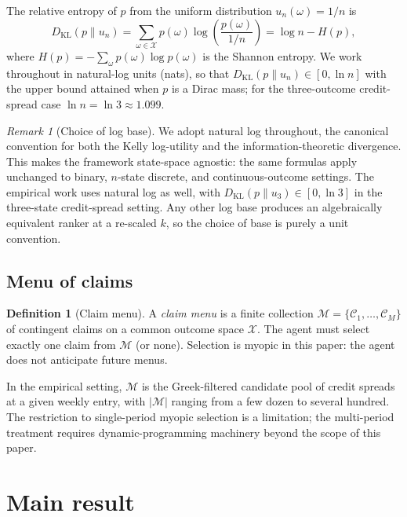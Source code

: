 \documentclass[11pt]{article}
\theoremstyle{definition}
\newtheorem{definition}[theorem]{Definition}
\theoremstyle{remark}
\newtheorem{remark}[theorem]{Remark}
\newcommand{\C}{\mathcal{C}}
\newcommand{\X}{\mathcal{X}}
\newcommand{\KL}{D_{\mathrm{KL}}}
\begin{document}
The relative entropy of $p$ from the uniform distribution
$u_n(\omega) = 1/n$ is
\begin{equation}
\KL(p \| u_n) = \sum_{\omega \in \X} p(\omega) \log\!\left(
    \frac{p(\omega)}{1/n}\right) = \log n - H(p),
\label{eq:KL}
\end{equation}
where $H(p) = -\sum_\omega p(\omega) \log p(\omega)$ is the Shannon
entropy. We work throughout in natural-log units (nats), so that
$\KL(p \| u_n) \in [0, \ln n]$ with the upper bound attained when $p$
is a Dirac mass; for the three-outcome credit-spread case
$\ln n = \ln 3 \approx 1.099$.

\begin{remark}[Choice of log base]\label{rem:logbase}
We adopt natural log throughout, the canonical convention for both
the Kelly log-utility and the information-theoretic divergence. This
makes the framework state-space agnostic: the same formulas apply
unchanged to binary, $n$-state discrete, and continuous-outcome
settings. The empirical work uses natural log as well, with
$\KL(p \| u_3) \in [0, \ln 3]$ in the three-state credit-spread
setting. Any other log base produces an algebraically equivalent
ranker at a re-scaled $k$, so the choice of base is purely a unit
convention.
\end{remark}

\subsection{Menu of claims}

\begin{definition}[Claim menu]\label{def:menu}
A \emph{claim menu} is a finite collection
$\mathcal{M} = \{\C_1, \ldots, \C_M\}$ of contingent claims on a common
outcome space $\X$. The agent must select exactly one claim from
$\mathcal{M}$ (or none). Selection is myopic in this paper: the agent
does not anticipate future menus.
\end{definition}

In the empirical setting, $\mathcal{M}$ is the Greek-filtered
candidate pool of credit spreads at a given weekly entry, with
$|\mathcal{M}|$ ranging from a few dozen to several hundred. The
restriction to single-period myopic selection is a limitation; the
multi-period treatment requires dynamic-programming machinery beyond
the scope of this paper.


\section{Main result}\label{sec:main}
\end{document}
